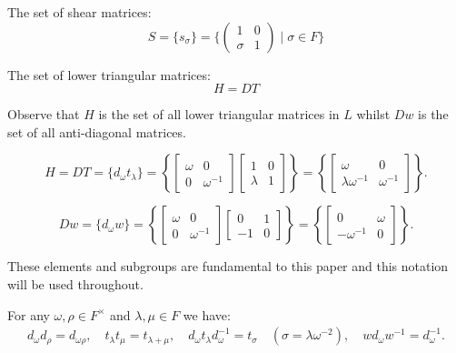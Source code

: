 \begin{definition}
    The set of shear matrices:
    \[
    S = \{s_\sigma\} = \{\begin{pmatrix}1 & 0\\ \sigma & 1\end{pmatrix} \; | \; \sigma \in F \}
    \]
\end{definition}

\begin{definition}
    The set of lower triangular matrices:
    \[
    H = DT
    \]
\end{definition}

Observe that $H$ is the set of all lower triangular matrices in $L$ whilst $Dw$ is the set of all anti-diagonal matrices.

\begin{equation} \label{Hlowertri} H = DT =  \{d_\omega t_\lambda\} = \left\{ \begin{bmatrix} \omega & 0 \\ 0 & \omega^{-1} \end{bmatrix} \begin{bmatrix} 1 & 0 \\ \lambda & 1 \end{bmatrix} \right\} = \left\{ \begin{bmatrix} \omega & 0 \\ \lambda \omega^{-1} & \omega^{-1} \end{bmatrix}  \right\}. \end{equation}

\begin{equation} \label{antidiag} Dw = \{ d_\omega w \} =  \left\{  \begin{bmatrix} \omega & 0 \\ 0 & \omega^{-1} \end{bmatrix} \begin{bmatrix} 0 & 1 \\ -1 & 0 \end{bmatrix} \right\} = \left\{ \begin{bmatrix} 0 & \omega \\ -\omega^{-1} & 0 \end{bmatrix}  \right\}. \end{equation}

These elements and subgroups are fundamental to this paper and this notation will be used throughout.

\begin{lemma}\label{6.1}
For any $\omega, \rho \in F^\times$ and $\lambda, \mu \in F$ we have:
\begin{align*} d_\omega d_{\rho}= d_{\omega\rho}, \quad t_\lambda t_\mu = t_{\lambda + \mu}, \quad d_\omega t_\lambda d^{-1}_\omega = t_\sigma \quad \! \! (\sigma=\lambda \omega^{-2}), \quad w d_\omega w^{-1} = d^{-1}_\omega.
\end{align*} 
\end{lemma}
\vspace{0mm}

